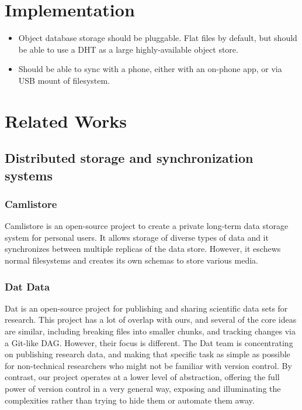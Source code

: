 \documentclass[a4paper]{article}
\begin{document}
\section{Implementation}\label{implementation}

\begin{itemize}
  \item
    Object database storage should be pluggable. Flat files by default, but
    should be able to use a DHT as a large highly-available object store.
  \item
    Should be able to sync with a phone, either with an on-phone app, or via USB
    mount of filesystem.
\end{itemize}


\section{Related Works}

\subsection{Distributed storage and synchronization systems}

\subsubsection{Camlistore}

Camlistore \cite{camlistore_homepage} is an open-source project to create a
private long-term data storage system for personal users. It allows storage of
diverse types of data and it synchronizes between multiple replicas of the data
store. However, it eschews normal filesystems and creates its own schemas to
store various media.


\subsubsection{Dat Data}

Dat \cite{dat_homepage} is an open-source project for publishing and sharing
scientific data sets for research. This project has a lot of overlap with ours,
and several of the core ideas are similar, including breaking files into smaller
chunks, and tracking changes via a Git-like DAG. However, their focus is
different. The Dat team is concentrating on publishing research data, and making
that specific task as simple as possible for non-technical researchers who might
not be familiar with version control. By contrast, our project operates at a
lower level of abstraction, offering the full power of version control in a very
general way, exposing and illuminating the complexities rather than trying to
hide them or automate them away.
\end{document}
